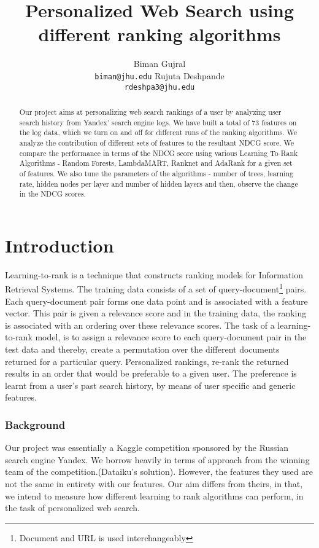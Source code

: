 \documentclass[11pt,letterpaper]{article}
\title{Personalized Web Search using different ranking algorithms}
\author{Biman Gujral\\
  {\tt biman@jhu.edu}
  \And
  Rujuta Deshpande \\
  {\tt rdeshpa3@jhu.edu}}
\date{}
\begin{document}
\maketitle
\begin{abstract}
Our project aims at personalizing web search rankings of a user by analyzing user search history from Yandex' search engine logs. We have built a total of 73 features on the log data, which we turn on and off for different runs of the ranking algorithms. We analyze the contribution of different sets of features to the resultant NDCG score. We compare the performance in terms of the NDCG score using various Learning To Rank Algorithms - Random Forests, LambdaMART, Ranknet and AdaRank for a given set of features. We also tune the parameters of the algorithms - number of trees, learning rate, hidden nodes per layer and number of hidden layers and then, observe the change in the NDCG scores. 
\end{abstract}

\section{Introduction}
Learning-to-rank is a technique that constructs ranking models for Information Retrieval Systems. The training data consists of a set of query-document\footnote{Document and URL is used interchangeably} pairs. Each query-document pair forms one data point and is associated with a feature vector. This pair is given a relevance score and in the training data, the ranking is associated with an ordering over these relevance scores. The task of a learning-to-rank model, is to assign a relevance score to each query-document pair in the test data and thereby, create a permutation over the different documents returned for a particular query. Personalized rankings, re-rank the returned results in an order that would be preferable to a given user. The preference is learnt from a user's past search history, by means of user specific and generic features. \\
\subsubsection{Background}
Our project was essentially a Kaggle competition sponsored by the Russian search engine Yandex. We borrow heavily in terms of approach from the winning team of the competition.(Dataiku's solution). However, the features they used are not the same in entirety with our features. Our aim differs from theirs, in that, we intend to measure how different learning to rank algorithms can perform, in the task of personalized web search. 
\end{document}
